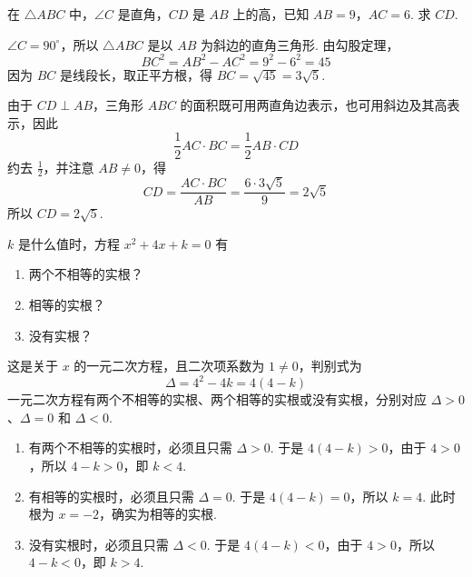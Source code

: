 \begin{problem}
在 \(\triangle ABC\) 中，\(\angle C\) 是直角，\(CD\) 是 \(AB\) 上的高，已知 \(AB=9\)，\(AC=6\). 求 \(CD\).
\end{problem}

\begin{solution}
\(\angle C=90^\circ\)，所以 \(\triangle ABC\) 是以 \(AB\) 为斜边的直角三角形. 由勾股定理，
\[
BC^2=AB^2-AC^2=9^2-6^2=45
\]
因为 \(BC\) 是线段长，取正平方根，得 \(BC=\sqrt{45}=3\sqrt{5}\).


由于 \(CD\perp AB\)，三角形 \(ABC\) 的面积既可用两直角边表示，也可用斜边及其高表示，因此
\[
\frac{1}{2}AC\cdot BC=\frac{1}{2}AB\cdot CD
\]
约去 \(\frac{1}{2}\)，并注意 \(AB\ne0\)，得
\[
CD=\frac{AC\cdot BC}{AB}=\frac{6\cdot3\sqrt{5}}{9}=2\sqrt{5}
\]
所以 \(CD=2\sqrt{5}\).
\end{solution}

\begin{problem}
\(k\) 是什么值时，方程 \(x^2+4x+k=0\) 有

\begin{enumerate}
\item 两个不相等的实根？
\item 相等的实根？
\item 没有实根？
\end{enumerate}
\end{problem}

\begin{solution}
这是关于 \(x\) 的一元二次方程，且二次项系数为 \(1\ne0\)，判别式为
\[
\Delta=4^2-4k=4\left(4-k\right)
\]
一元二次方程有两个不相等的实根、两个相等的实根或没有实根，分别对应 \(\Delta>0\)、\(\Delta=0\) 和 \(\Delta<0\).

\begin{enumerate}
\item 有两个不相等的实根时，必须且只需 \(\Delta>0\). 于是 \(4\left(4-k\right)>0\)，由于 \(4>0\)，所以 \(4-k>0\)，即 \(k<4\).

\item 有相等的实根时，必须且只需 \(\Delta=0\). 于是 \(4\left(4-k\right)=0\)，所以 \(k=4\). 此时根为 \(x=-2\)，确实为相等的实根.

\item 没有实根时，必须且只需 \(\Delta<0\). 于是 \(4\left(4-k\right)<0\)，由于 \(4>0\)，所以 \(4-k<0\)，即 \(k>4\).
\end{enumerate}
\end{solution}

